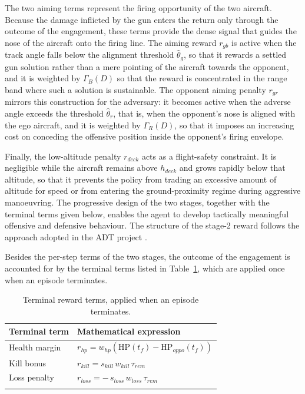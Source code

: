 \documentclass[pdflatex,sn-mathphys-num]{sn-jnl}%
\theoremstyle{thmstyleone}%
\theoremstyle{thmstyletwo}%
\theoremstyle{thmstylethree}%
\begin{document}
The two aiming terms represent the firing opportunity of the two aircraft. Because the damage inflicted by the gun enters the return only through the outcome of the engagement, these terms provide the dense signal that guides the nose of the aircraft onto the firing line. The aiming reward $r_{gb}$ is active when the track angle falls below the alignment threshold $\hat{\theta}_{g}$, so that it rewards a settled gun solution rather than a mere pointing of the aircraft towards the opponent, and it is weighted by $\Gamma_{B}(D)$ so that the reward is concentrated in the range band where such a solution is sustainable. The opponent aiming penalty $r_{gr}$ mirrors this construction for the adversary: it becomes active when the adverse angle exceeds the threshold $\hat{\theta}_{r}$, that is, when the opponent's nose is aligned with the ego aircraft, and it is weighted by $\Gamma_{R}(D)$, so that it imposes an increasing cost on conceding the offensive position inside the opponent's firing envelope.

Finally, the low-altitude penalty $r_{deck}$ acts as a flight-safety constraint. It is negligible while the aircraft remains above $h_{deck}$ and grows rapidly below that altitude, so that it prevents the policy from trading an excessive amount of altitude for speed or from entering the ground-proximity regime during aggressive manoeuvring. The progressive design of the two stages, together with the terminal terms given below, enables the agent to develop tactically meaningful offensive and defensive behaviour. The structure of the stage-2 reward follows the approach adopted in the ADT project \cite{pope_hierarchical_2023}.

Besides the per-step terms of the two stages, the outcome of the engagement is accounted for by the terminal terms listed in Table~\ref{tab:reward_terminal}, which are applied once when an episode terminates.

\begin{table}[h]
\caption{Terminal reward terms, applied when an episode terminates.}\label{tab:reward_terminal}%
\begin{tabular*}{\textwidth}{@{\extracolsep\fill}p{}p{}}
\toprule
Terminal term & Mathematical expression \\
\midrule
Health margin
& $r_{hp}=w_{hp}\left(\mathrm{HP}(t_{f})-\mathrm{HP}_{oppo}(t_{f})\right)$ \\[6pt]

Kill bonus
& $r_{kill}=s_{kill}\,w_{kill}\,\tau_{rem}$ \\[6pt]

Loss penalty
& $r_{loss}=-\,s_{loss}\,w_{loss}\,\tau_{rem}$ \\
\botrule
\end{tabular*}
\end{table}
\end{document}
